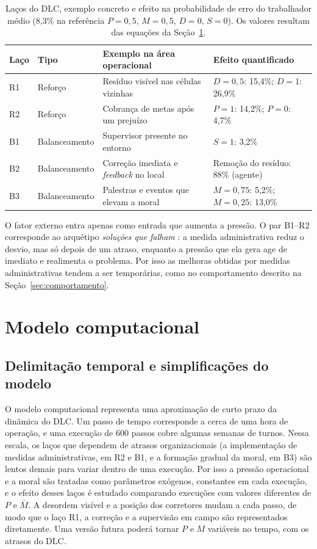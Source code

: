 \documentclass[11pt, a4paper]{article}
\begin{document}
\begin{table}[t]
\centering
\footnotesize
\caption{Laços do DLC, exemplo concreto e efeito na probabilidade de erro do trabalhador médio (8,3\% na referência $P=0{,}5$, $M=0{,}5$, $D=0$, $S=0$). Os valores resultam das equações da Seção~\ref{sec:modelo}.}
\label{tab:lacos}
\begin{tabular}{@{}llp{5.2cm}l@{}}
\toprule
Laço & Tipo & Exemplo na área operacional & Efeito quantificado \\
\midrule
R1 & Reforço & Resíduo visível nas células vizinhas & $D=0{,}5$: 15,4\%; $D=1$: 26,9\% \\
R2 & Reforço & Cobrança de metas após um prejuízo & $P=1$: 14,2\%; $P=0$: 4,7\% \\
B1 & Balanceamento & Supervisor presente no entorno & $S=1$: 3,2\% \\
B2 & Balanceamento & Correção imediata e \emph{feedback} no local & Remoção do resíduo: 88\% (agente) \\
B3 & Balanceamento & Palestras e eventos que elevam a moral & $M=0{,}75$: 5,2\%; $M=0{,}25$: 13,0\% \\
\bottomrule
\end{tabular}
\end{table}

O fator externo entra apenas como entrada que aumenta a pressão. O par B1--R2 corresponde ao arquétipo \emph{soluções que falham} \citep{meadows2022}: a medida administrativa reduz o desvio, mas só depois de um atraso, enquanto a pressão que ela gera age de imediato e realimenta o problema. Por isso as melhoras obtidas por medidas administrativas tendem a ser temporárias, como no comportamento descrito na Seção~\ref{sec:comportamento}.

\section{Modelo computacional}\label{sec:modelo}
\subsection{Delimitação temporal e simplificações do modelo}
O modelo computacional representa uma aproximação de curto prazo da dinâmica do DLC. Um passo de tempo corresponde a cerca de uma hora de operação, e uma execução de 600 passos cobre algumas semanas de turnos. Nessa escala, os laços que dependem de atrasos organizacionais (a implementação de medidas administrativas, em R2 e B1, e a formação gradual da moral, em B3) são lentos demais para variar dentro de uma execução. Por isso a pressão operacional e a moral são tratadas como parâmetros exógenos, constantes em cada execução, e o efeito desses laços é estudado comparando execuções com valores diferentes de $P$ e $\bar M$. A desordem visível e a posição dos corretores mudam a cada passo, de modo que o laço R1, a correção e a supervisão em campo são representados diretamente. Uma versão futura poderá tornar $P$ e $M$ variáveis no tempo, com os atrasos do DLC.
\end{document}
